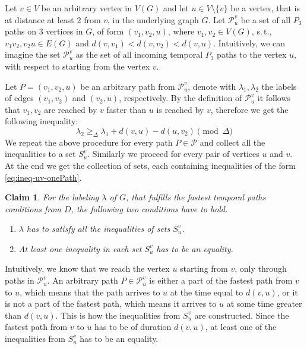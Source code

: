 \documentclass[11pt,a4paper]{article}
\newtheorem{claim}[theorem]{Claim}
\theoremstyle{remark}
\theoremstyle{definition}
\newcommand{\st}{s.\,t.,\ }
\begin{document}
	Let $v \in V$ be an arbitrary vertex in $V(G)$ and let $u \in V \setminus \{v\}$ be a vertex, that is at distance at least $2$ from $v$, in the underlying graph $G$.
	Let $\mathcal{P}_{u}^v$ be a set of all $P_3$ paths on $3$ vertices in $G$, of form $(v_1, v_2, u)$, where $v_1, v_2 \in V(G)$, \st $v_1 v_2, v_2 u \in E(G)$ and $d(v,v_1) < d(v,v_2) < d(v,u)$. 
	Intuitively, we can imagine the set $\mathcal{P}_{u}^v$ as the set of all incoming temporal $P_3$ paths to the vertex $u$, with respect to starting from the vertex $v$.
	
	Let $P = (v_1,v_2,u)$ be an arbitrary path from $\mathcal{P}_u^v$, denote with $\lambda_1, \lambda_2$ the labels of edges $(v_1,v_2)$ and $(v_2, u)$, respectively.
	By the definition of $\mathcal{P}_u^v$ it follows that $v_1, v_2$ are reached by $v$ faster than $u$ is reached by $v$, therefore we get the following inequality:
	\begin{equation}\label{eq:ineq-uv-onePath}
	    \lambda_2 \geq_\Delta \lambda_1 + d(v,u)-d(u,v_2) \pmod \Delta
	\end{equation}
	We repeat the above procedure for every path $P \in \mathcal{P}$ and collect all the inequalities to a set $S_u^v$.
	Similarly we proceed for every pair of vertices $u$ and $v$.
	At the end we get the collection of sets, each containing inequalities of the form \cref{eq:ineq-uv-onePath}.
	
	\begin{claim}
	\label{claim:exact-setsOfInequalities}
	For the labeling $\lambda$ of $G$, that fulfills the fastest temporal paths conditions from $D$, the following two conditions have to hold. 
	\begin{enumerate}
	    \item $\lambda$ has to satisfy all the inequalities of sets $S_u^v$.
	    \item At least one inequality in each set $S_u^v$ has to be an equality.
	\end{enumerate}
	\end{claim}
    Intuitively, we know that we reach the vertex $u$ starting from $v$, only through paths in $\mathcal{P}_u^v$. 
    An arbitrary path $P \in \mathcal{P}_u^v$ is either a part of the fastest path from $v$ to $u$, which means that the path arrives to $u$ at the time equal to $d(v,u)$,
    or it is not a part of the fastest path, which means it arrives to $u$ at some time greater than $d(v,u)$.
    This is how the inequalities from $S_u^v$ are constructed. Since the fastest path from $v$ to $u$ has to be of duration $d(v,u)$, at least one of the inequalities from $S_u^v$ has to be an equality.
    
\end{document}
